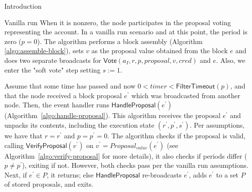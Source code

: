 \documentclass[10pt,a4paper]{article}
\begin{document}
\begin{section}{Introduction}
\begin{subsection}{Vanilla run}
When it is nonzero, the node participates in the proposal voting representing the account.
In a vanilla run scenario and at this point, the period is zero ($p=0$). 
The algorithm performs a block assembly (Algorithm \ref{algo:assemble-block}), 
sets $v$ as the proposal value obtained from the block $e$ and does two separate 
broadcasts for $\mathsf{Vote}(a_I, r,p, proposal, v, cred)$ and $e$.
Also, we enter the "soft vote" step setting $s:=1$.


%


Assume that some time has passed and now $0<timer<\mathsf{FilterTimeout}(p)$, and that 
the node received a block proposal $e^\prime$ which was broadcasted from another node. 
Then, the event handler runs $\mathsf{HandleProposal}(e^\prime)$ (Algorithm~\ref{algo:handle-proposal}).
This algorithm receives the proposal $e^\prime$ and unpacks its contents,
including the execution state $(r^\prime,p^\prime,s^\prime)$.
Per assumptions, we have that $r=r^\prime$ and $p=p^\prime=0$.
The algorithm checks if the proposal is valid, calling $\mathsf{VerifyProposal}(v^\prime)$ 
on $v^\prime=Proposal_{value}(e^\prime)$ (see Algorithm~\ref{algo:verify-proposal} for more details),
it also checks if periods differ ($p\neq p^\prime$), exiting if not. However, both checks pass per 
the vanilla run assumptions.
Next, if $e^\prime\in P$, it returns; else $\mathsf{HandleProposal}$ re-broadcasts $e^\prime$, 
adds $e^\prime$ to a set $P$ of stored proposals, and exits.


\end{subsection}
\end{section}
\end{document}
